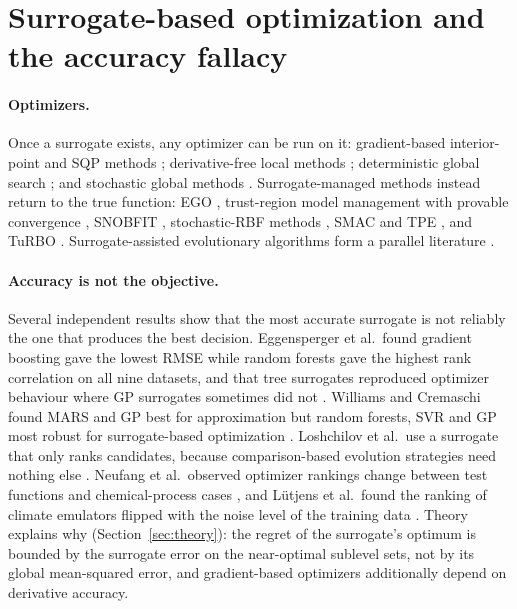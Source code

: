 \section{Surrogate-based optimization and the accuracy fallacy}
\label{sec:sbo}

\paragraph{Optimizers.} Once a surrogate exists, any optimizer can be run on it: gradient-based interior-point and SQP
methods \cite{wachter2006implementation,nocedal2006numerical,kraft1988software}; derivative-free local methods
\cite{nelder1965simplex,powell1994direct,audet2006mesh}; deterministic global search \cite{jones1993lipschitzian}; and
stochastic global methods \cite{storn1997differential,hansen2001completely,kennedy1995particle,wales1997global}.
Surrogate-managed methods instead return to the true function: EGO \cite{jones1998efficient}, trust-region model
management with provable convergence \cite{alexandrov1998trust}, SNOBFIT \cite{huyer2008snobfit}, stochastic-RBF methods
\cite{regis2007stochastic,regis2013combining}, SMAC and TPE \cite{hutter2011sequential,bergstra2011algorithms}, and TuRBO
\cite{eriksson2019scalable}. Surrogate-assisted evolutionary algorithms form a parallel literature
\cite{jin2005comprehensive,jin2011surrogate}.

\paragraph{Accuracy is not the objective.} Several independent results show that the most accurate surrogate is not
reliably the one that produces the best decision. Eggensperger et al.\ found gradient boosting gave the lowest RMSE while
random forests gave the highest rank correlation on all nine datasets, and that tree surrogates reproduced optimizer
behaviour where GP surrogates sometimes did not \cite{eggensperger2015efficient,eggensperger2018efficient}. Williams and
Cremaschi found MARS and GP best for approximation but random forests, SVR and GP most robust for surrogate-based
optimization \cite{williams2021selection}. Loshchilov et al.\ use a surrogate that only ranks candidates, because
comparison-based evolution strategies need nothing else \cite{loshchilov2012self}. Neufang et al.\ observed optimizer
rankings change between test functions and chemical-process cases \cite{neufang2024surrogate}, and Lütjens et al.\
found the ranking of climate emulators flipped with the noise level of the training data \cite{lutjens2024climatebench}.
Theory explains why (Section~\ref{sec:theory}): the regret of the surrogate's optimum is bounded by the surrogate error on
the near-optimal sublevel sets, not by its global mean-squared error, and gradient-based optimizers additionally depend
on derivative accuracy.


